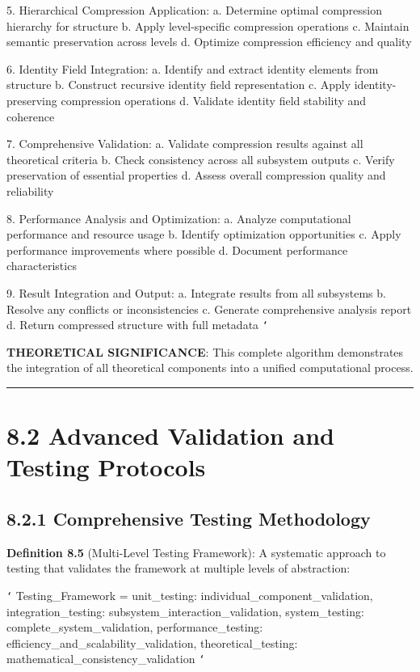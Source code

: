 5. Hierarchical Compression Application:
   a. Determine optimal compression hierarchy for structure
   b. Apply level-specific compression operations
   c. Maintain semantic preservation across levels
   d. Optimize compression efficiency and quality
   
6. Identity Field Integration:
   a. Identify and extract identity elements from structure
   b. Construct recursive identity field representation
   c. Apply identity-preserving compression operations
   d. Validate identity field stability and coherence
   
7. Comprehensive Validation:
   a. Validate compression results against all theoretical criteria
   b. Check consistency across all subsystem outputs
   c. Verify preservation of essential properties
   d. Assess overall compression quality and reliability
   
8. Performance Analysis and Optimization:
   a. Analyze computational performance and resource usage
   b. Identify optimization opportunities
   c. Apply performance improvements where possible
   d. Document performance characteristics
   
9. Result Integration and Output:
   a. Integrate results from all subsystems
   b. Resolve any conflicts or inconsistencies
   c. Generate comprehensive analysis report
   d. Return compressed structure with full metadata
\texttt{`}

\textbf{THEORETICAL SIGNIFICANCE}: This complete algorithm demonstrates the integration of all theoretical components into a unified computational process.

\hrule

\section{8.2 Advanced Validation and Testing Protocols}

\subsection{8.2.1 Comprehensive Testing Methodology}

\textbf{Definition 8.5} (Multi-Level Testing Framework): A systematic approach to testing that validates the framework at multiple levels of abstraction:

\texttt{`}
Testing_Framework = {
    unit_testing: individual_component_validation,
    integration_testing: subsystem_interaction_validation,
    system_testing: complete_system_validation,
    performance_testing: efficiency_and_scalability_validation,
    theoretical_testing: mathematical_consistency_validation
}
\texttt{`}

